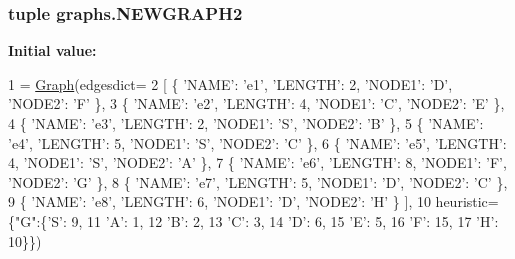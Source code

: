 \subsubsection[{N\+E\+W\+G\+R\+A\+P\+H2}]{\setlength{\rightskip}{0pt plus 5cm}tuple graphs.\+N\+E\+W\+G\+R\+A\+P\+H2}\label{namespacegraphs_aa9d133c69e3c2a88607b5ce7a3b43754}
{\bfseries Initial value\+:}
\begin{DoxyCode}
1 = \hyperlink{classsearch_1_1_graph}{Graph}(edgesdict=
2                   [ \{ \textcolor{stringliteral}{'NAME'}: \textcolor{stringliteral}{'e1'}, \textcolor{stringliteral}{'LENGTH'}: 2, \textcolor{stringliteral}{'NODE1'}: \textcolor{stringliteral}{'D'}, \textcolor{stringliteral}{'NODE2'}: \textcolor{stringliteral}{'F'} \},
3                     \{ \textcolor{stringliteral}{'NAME'}: \textcolor{stringliteral}{'e2'}, \textcolor{stringliteral}{'LENGTH'}: 4, \textcolor{stringliteral}{'NODE1'}: \textcolor{stringliteral}{'C'}, \textcolor{stringliteral}{'NODE2'}: \textcolor{stringliteral}{'E'} \},
4                     \{ \textcolor{stringliteral}{'NAME'}: \textcolor{stringliteral}{'e3'}, \textcolor{stringliteral}{'LENGTH'}: 2, \textcolor{stringliteral}{'NODE1'}: \textcolor{stringliteral}{'S'}, \textcolor{stringliteral}{'NODE2'}: \textcolor{stringliteral}{'B'} \},
5                     \{ \textcolor{stringliteral}{'NAME'}: \textcolor{stringliteral}{'e4'}, \textcolor{stringliteral}{'LENGTH'}: 5, \textcolor{stringliteral}{'NODE1'}: \textcolor{stringliteral}{'S'}, \textcolor{stringliteral}{'NODE2'}: \textcolor{stringliteral}{'C'} \},
6                     \{ \textcolor{stringliteral}{'NAME'}: \textcolor{stringliteral}{'e5'}, \textcolor{stringliteral}{'LENGTH'}: 4, \textcolor{stringliteral}{'NODE1'}: \textcolor{stringliteral}{'S'}, \textcolor{stringliteral}{'NODE2'}: \textcolor{stringliteral}{'A'} \},
7                     \{ \textcolor{stringliteral}{'NAME'}: \textcolor{stringliteral}{'e6'}, \textcolor{stringliteral}{'LENGTH'}: 8, \textcolor{stringliteral}{'NODE1'}: \textcolor{stringliteral}{'F'}, \textcolor{stringliteral}{'NODE2'}: \textcolor{stringliteral}{'G'} \},
8                     \{ \textcolor{stringliteral}{'NAME'}: \textcolor{stringliteral}{'e7'}, \textcolor{stringliteral}{'LENGTH'}: 5, \textcolor{stringliteral}{'NODE1'}: \textcolor{stringliteral}{'D'}, \textcolor{stringliteral}{'NODE2'}: \textcolor{stringliteral}{'C'} \},
9                     \{ \textcolor{stringliteral}{'NAME'}: \textcolor{stringliteral}{'e8'}, \textcolor{stringliteral}{'LENGTH'}: 6, \textcolor{stringliteral}{'NODE1'}: \textcolor{stringliteral}{'D'}, \textcolor{stringliteral}{'NODE2'}: \textcolor{stringliteral}{'H'} \} ],
10                   heuristic=\{\textcolor{stringliteral}{"G"}:\{\textcolor{stringliteral}{'S'}: 9,
11                                   \textcolor{stringliteral}{'A'}: 1,
12                                   \textcolor{stringliteral}{'B'}: 2,
13                                   \textcolor{stringliteral}{'C'}: 3,
14                                   \textcolor{stringliteral}{'D'}: 6,
15                                   \textcolor{stringliteral}{'E'}: 5,
16                                   \textcolor{stringliteral}{'F'}: 15,
17                                   \textcolor{stringliteral}{'H'}: 10\}\})
\end{DoxyCode}
